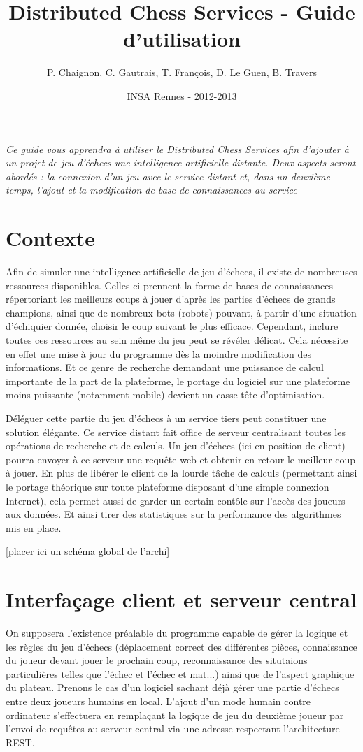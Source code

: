 \documentclass[a4paper,11pt]{article}
\title{Distributed Chess Services - Guide d'utilisation}
\author{P. Chaignon, C. Gautrais, T. François, D. Le Guen, B. Travers}
\date{INSA Rennes - 2012-2013}
\begin{document}
\maketitle{}

{\em Ce guide vous apprendra à utiliser le Distributed Chess Services afin d'ajouter à un projet de jeu d'échecs une intelligence artificielle distante. Deux aspects seront abordés : la connexion d'un jeu avec le service distant et, dans un deuxième temps, l'ajout et la modification de base de connaissances au service}


\section*{Contexte}
        Afin de simuler une intelligence artificielle de jeu d'échecs, il existe de nombreuses ressources disponibles. Celles-ci prennent la forme de bases de connaissances répertoriant les meilleurs coups à jouer d'après les parties d'échecs de grands champions, ainsi que de nombreux bots (robots) pouvant, à partir d'une situation d'échiquier donnée, choisir le coup suivant le plus efficace. Cependant, inclure toutes ces ressources au sein même du jeu peut se révéler délicat. Cela nécessite en effet une mise à jour du programme dès la moindre modification des informations. Et ce genre de recherche demandant une puissance de calcul importante de la part de la plateforme, le portage du logiciel sur une plateforme moins puissante (notamment mobile) devient un casse-tête d'optimisation.
        
        Déléguer cette partie du jeu d'échecs à un service tiers peut constituer une solution élégante. Ce service distant fait office de serveur centralisant toutes les opérations de recherche et de calculs. Un jeu d'échecs (ici en position de client) pourra envoyer à ce serveur une requête web et obtenir en retour le meilleur coup à jouer. En plus de libérer le client de la lourde tâche de calculs (permettant ainsi le portage théorique sur toute plateforme disposant d'une simple connexion Internet), cela permet aussi de garder un certain contôle sur l'accès des joueurs aux données. Et ainsi tirer des statistiques sur la performance des algorithmes mis en place.


[placer ici un schéma global de l’archi]


\section{Interfaçage client et serveur central}
        On supposera l'existence préalable du programme capable de gérer la logique et les règles du jeu d'échecs (déplacement correct des différentes pièces, connaissance du joueur devant jouer le prochain coup, reconnaissance des situtaions particulières telles que l'échec et l'échec et mat...) ainsi que de l'aspect graphique du plateau. Prenons le cas d'un logiciel sachant déjà gérer une partie d'échecs entre deux joueurs humains en local. L'ajout d'un mode humain contre ordinateur s'effectuera en remplaçant la logique de jeu du deuxième joueur par l'envoi de requêtes au serveur central via une adresse respectant l’architecture REST. 
\end{document}
